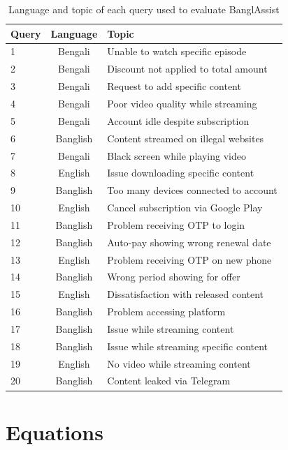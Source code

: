 \documentclass[sigconf]{acmart}
\begin{document}
\begin{table}[H]
    \caption{Language and topic of each query used to evaluate BanglAssist}
    \label{tab3}
    \begin{tabular}{lcl}
        \toprule
        \textbf{Query} & \textbf{Language} & \textbf{Topic}\\
        \toprule
        1 & Bengali & Unable to watch specific episode\\
        2 & Bengali & Discount not applied to total amount\\
        3 & Bengali & Request to add specific content\\
        4 & Bengali & Poor video quality while streaming\\
        5 & Bengali & Account idle despite subscription\\
        6 & Banglish & Content streamed on illegal websites\\
        7 & Bengali & Black screen while playing video\\
        8 & English & Issue downloading specific content\\
        9 & Banglish & Too many devices connected to account\\
        10 & English & Cancel subscription via Google Play\\
        11 & Banglish & Problem receiving OTP to login\\
        12 & Banglish & Auto-pay showing wrong renewal date\\
        13 & English & Problem receiving OTP on new phone\\
        14 & Banglish & Wrong period showing for offer\\
        15 & English & Dissatisfaction with released content\\
        16 & Banglish & Problem accessing platform\\
        17 & Banglish & Issue while streaming content\\
        18 & Banglish & Issue while streaming specific content\\
        19 & English & No video while streaming content\\
        20 & Banglish & Content leaked via Telegram\\
        \bottomrule
    \end{tabular}
\end{table}

\section{Equations}
\label{appendix:f}
\end{document}
